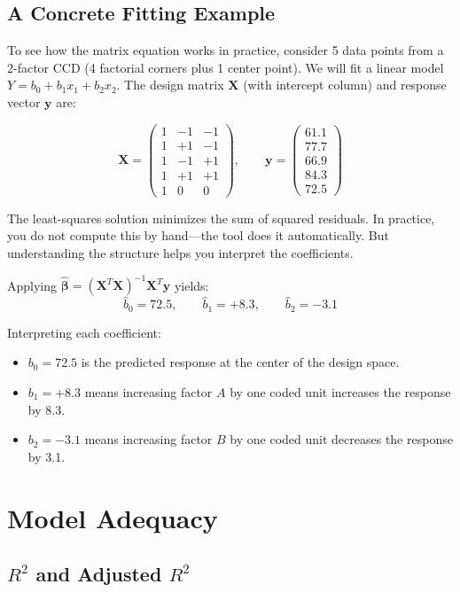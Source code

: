 \documentclass[11pt]{book}
\begin{document}
\subsection{A Concrete Fitting Example}

To see how the matrix equation works in practice, consider 5 data points from a
2-factor CCD (4 factorial corners plus 1 center point). We will fit a linear
model $Y = b_0 + b_1 x_1 + b_2 x_2$. The design matrix $\mathbf{X}$ (with
intercept column) and response vector $\mathbf{y}$ are:

\[
\mathbf{X} = \begin{pmatrix}
1 & -1 & -1 \\
1 & +1 & -1 \\
1 & -1 & +1 \\
1 & +1 & +1 \\
1 &  0 &  0
\end{pmatrix},
\qquad
\mathbf{y} = \begin{pmatrix}
61.1 \\ 77.7 \\ 66.9 \\ 84.3 \\ 72.5
\end{pmatrix}
\]

The least-squares solution minimizes the sum of squared residuals. In practice,
you do not compute this by hand---the tool does it automatically. But
understanding the structure helps you interpret the coefficients.

Applying $\hat{\boldsymbol{\beta}} = (\mathbf{X}^T\mathbf{X})^{-1}
\mathbf{X}^T\mathbf{y}$ yields:
\[
\hat{b}_0 = 72.5, \qquad \hat{b}_1 = +8.3, \qquad \hat{b}_2 = -3.1
\]

Interpreting each coefficient:
\begin{itemize}[nosep]
\item $b_0 = 72.5$ is the predicted response at the center of the design space.
\item $b_1 = +8.3$ means increasing factor $A$ by one coded unit increases the
      response by 8.3.
\item $b_2 = -3.1$ means increasing factor $B$ by one coded unit decreases the
      response by 3.1.
\end{itemize}

\section{Model Adequacy}

\subsection{$R^2$ and Adjusted $R^2$}
\end{document}
